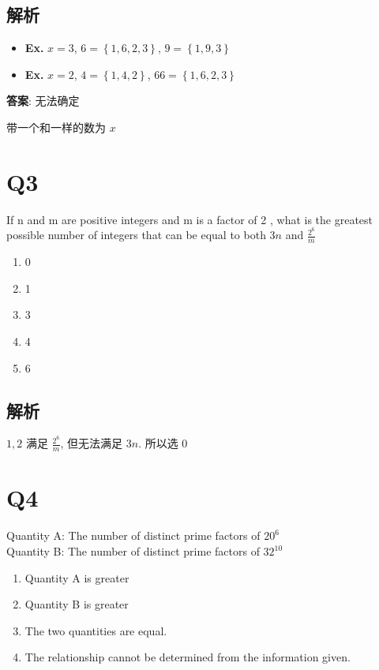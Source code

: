   \subsection{解析}

    \begin{itemize}
      \item \textbf{Ex.} $ x = 3 $, $ 6 = \left\{ 1, 6, 2, 3 \right\} $,
      $ 9 = \left\{ 1, 9, 3 \right\} $
      \item \textbf{Ex.} $ x = 2 $, $ 4 = \left\{ 1, 4, 2 \right\} $,
      $ 6 6 = \left\{ 1, 6, 2, 3 \right\} $
    \end{itemize}

    \textbf{答案}: 无法确定

    带一个和一样的数为 $ x $

\section{Q3}

  If n and m are positive integers and m is a factor of 2 , what is the
  greatest possible number of integers that can be equal to both
  $ 3n $ and $ \frac{2^{6}}{m} $

  \begin{enumerate}
    \item 0
    \item 1
    \item 3
    \item 4
    \item 6
  \end{enumerate}

  \subsection{解析}

    $ 1, 2 $ 满足 $ \frac{2^{6}}{m} $, 但无法满足 $ 3n $. 所以选 $ 0 $

\section{Q4}

  \begin{center}
    Quantity A: The number of distinct prime factors of $ 20^{6} $ \\
    Quantity B: The number of distinct prime factors of $ 32^{10} $
  \end{center}

  \begin{enumerate}
    \item Quantity A is greater
    \item Quantity B is greater
    \item The two quantities are equal.
    \item The relationship cannot be determined from the information given.
  \end{enumerate}

